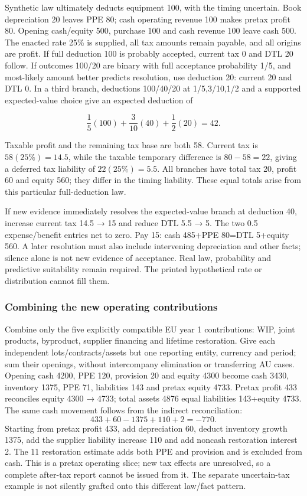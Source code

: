 Synthetic law ultimately deducts equipment 100, with the timing uncertain. Book depreciation 20 leaves PPE 80; cash operating revenue 100 makes pretax profit 80. Opening cash/equity 500, purchase 100 and cash revenue 100 leave cash 500. The enacted rate 25\% is supplied, all tax amounts remain payable, and all origins are profit. If full deduction 100 is probably accepted, current tax 0 and DTL 20 follow. If outcomes 100/20 are binary with full acceptance probability 1/5, and most-likely amount better predicts resolution, use deduction 20: current 20 and DTL 0. In a third branch, deductions 100/40/20 at 1/5,3/10,1/2 and a supported expected-value choice give an expected deduction of

\[\frac15(100)+\frac3{10}(40)+\frac12(20)=42.\]

Taxable profit and the remaining tax base are both 58. Current tax is \(58(25\%)=14.5\), while the taxable temporary difference is \(80-58=22\), giving a deferred tax liability of \(22(25\%)=5.5\). All branches have total tax 20, profit 60 and equity 560; they differ in the timing liability. These equal totals arise from this particular full-deduction law.

If new evidence immediately resolves the expected-value branch at deduction 40, increase current tax 14.5 → 15 and reduce DTL 5.5 → 5. The two 0.5 expense/benefit entries net to zero. Pay 15: cash 485+PPE 80=DTL 5+equity 560. A later resolution must also include intervening depreciation and other facts; silence alone is not new evidence of acceptance. Real law, probability and predictive suitability remain required. The printed hypothetical rate or distribution cannot fill them.

\hypertarget{combining-the-new-operating-contributions}{%
\subsubsection{Combining the new operating contributions}\label{combining-the-new-operating-contributions}}

Combine only the five explicitly compatible EU year 1 contributions: WIP, joint products, byproduct, supplier financing and lifetime restoration. Give each independent lots/contracts/assets but one reporting entity, currency and period; sum their openings, without intercompany elimination or transferring AU cases. Opening cash 4200, PPE 120, provision 20 and equity 4300 become cash 3430, inventory 1375, PPE 71, liabilities 143 and pretax equity 4733. Pretax profit 433 reconciles equity 4300 → 4733; total assets 4876 equal liabilities 143+equity 4733. The same cash movement follows from the indirect reconciliation:
\[433+60-1375+110+2=-770.\]
Starting from pretax profit 433, add depreciation 60, deduct inventory growth 1375, add the supplier liability increase 110 and add noncash restoration interest 2. The 11 restoration estimate adds both PPE and provision and is excluded from cash. This is a pretax operating slice; new tax effects are unresolved, so a complete after-tax report cannot be issued from it. The separate uncertain-tax example is not silently grafted onto this different law/fact pattern.
